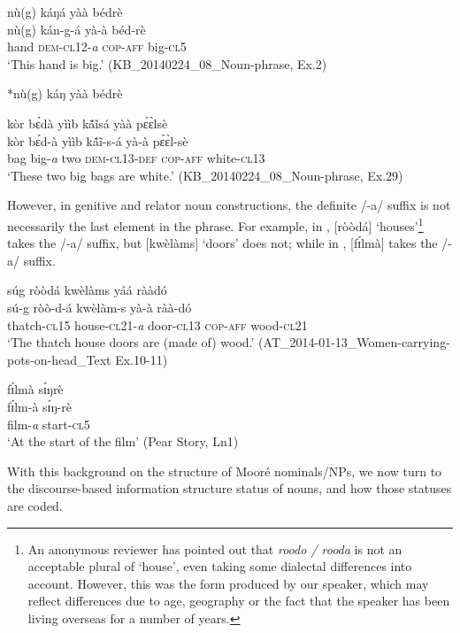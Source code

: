 \documentclass[output=paper]{langsci/langscibook}
\begin{document}
\ea\label{ex:teo:21}
\glll nù(g) káŋá yàà bédrè\\
 nù(g) kán-g-á yà-à béd-rè\\
hand \textsc{dem-cl}12-\textit{a} \textsc{cop-aff} big-\textsc{cl}5 \\
\glt ‘This hand is big.’ (KB\_20140224\_08\_Noun-phrase, Ex.2)
\z

\ea\label{ex:teo:22}
*nù(g) káŋ yàà bédrè
\z

\ea\label{ex:teo:23}
\glll kòr b\'ɛdà yììb k\'ã\~{i}sá yàà p\'ɛ\`ɛlsè\\
 kòr b\'ɛd-à yììb k\'ã\~{i}-s-á yà-à p\'ɛ\`ɛl-sè\\
bag big-\textit{a} two \textsc{dem}-\textsc{cl13-}\textsc{def} \textsc{cop-aff} white-\textsc{cl13}\\
\glt ‘These two big bags are white.’ (KB\_20140224\_08\_Noun-phrase, Ex.29)
\z

However, in genitive and relator noun constructions, the definite /-a/ suffix is not necessarily the last element in the phrase. For example, in , [ròòdá] ‘houses’\footnote{An anonymous reviewer has pointed out that \textit{roodo / rooda} is not an acceptable plural of ‘house’, even taking some dialectal differences into account. However, this was the form produced by our speaker, which may reflect differences due to age, geography or the fact that the speaker has been living overseas for a number of years.} takes the /-a/ suffix, but [kwèlàms] ‘doors’ does not; while in , [f\'ɪlmà] takes the /-a/ suffix.

\ea\label{ex:teo:24}
\glll súg ròòdá kwèlàms yáá rààdó\\
 sú-g ròò-d-á kwèlàm-s yà-à ràà-dó\\
thatch-\textsc{cl15} house-\textsc{cl21-}\textit{a} door-\textsc{cl13} \textsc{cop-aff} wood-\textsc{cl21}\\
\glt ‘The thatch house doors are (made of) wood.’ (AT\_2014-01-13\_Women-carrying-pots-on-head\_Text Ex.10-11)
\z

\ea\label{ex:teo:25}
\glll f\'ɪlmà s\'ɪŋrè\\
 f\'ɪlm-à s\'ɪŋ-rè\\
film-\textit{a} start-\textsc{cl5}\\
\glt ‘At the start of the film’ (Pear Story, Ln1)
\z

With this background on the structure of Mooré nominals/NPs, we now turn to the discourse-based information structure status of nouns, and how those statuses are coded.
\end{document}
